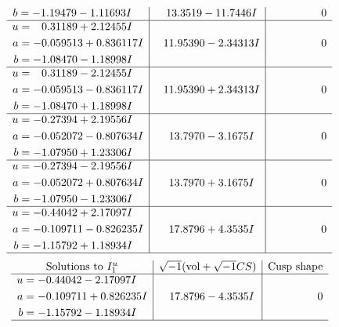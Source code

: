 \documentclass[1p]{elsarticle_modified}
\theoremstyle{definition}
\newcommand{\I}{\sqrt{-1}}
\begin{document}
$$\begin{array}{c|c|c}
\begin{aligned}
b &= -1.19479 - 1.11693 I\end{aligned}
 & \phantom{-}13.3519 - 11.7446 I & \phantom{-0.000000 } 0 \\ \hline\begin{aligned}
u &= \phantom{-}0.31189 + 2.12455 I \\
a &= -0.059513 + 0.836117 I \\
b &= -1.08470 - 1.18998 I\end{aligned}
 & \phantom{-}11.95390 - 2.34313 I & \phantom{-0.000000 } 0 \\ \hline\begin{aligned}
u &= \phantom{-}0.31189 - 2.12455 I \\
a &= -0.059513 - 0.836117 I \\
b &= -1.08470 + 1.18998 I\end{aligned}
 & \phantom{-}11.95390 + 2.34313 I & \phantom{-0.000000 } 0 \\ \hline\begin{aligned}
u &= -0.27394 + 2.19556 I \\
a &= -0.052072 - 0.807634 I \\
b &= -1.07950 + 1.23306 I\end{aligned}
 & \phantom{-}13.7970 - 3.1675 I & \phantom{-0.000000 } 0 \\ \hline\begin{aligned}
u &= -0.27394 - 2.19556 I \\
a &= -0.052072 + 0.807634 I \\
b &= -1.07950 - 1.23306 I\end{aligned}
 & \phantom{-}13.7970 + 3.1675 I & \phantom{-0.000000 } 0 \\ \hline\begin{aligned}
u &= -0.44042 + 2.17097 I \\
a &= -0.109711 - 0.826235 I \\
b &= -1.15792 + 1.18934 I\end{aligned}
 & \phantom{-}17.8796 + 4.3535 I & \phantom{-0.000000 } 0\\
 \hline 
 \end{array}$$\newpage$$\begin{array}{c|c|c}  
\text{Solutions to }I^u_{1}& \I (\text{vol} + \sqrt{-1}CS) & \text{Cusp shape}\\
 \hline 
\begin{aligned}
u &= -0.44042 - 2.17097 I \\
a &= -0.109711 + 0.826235 I \\
b &= -1.15792 - 1.18934 I\end{aligned}
 & \phantom{-}17.8796 - 4.3535 I & \phantom{-0.000000 } 0\\
 \hline 
 \end{array}$$\newpage\newpage\renewcommand{\arraystretch}{1}
\end{document}
